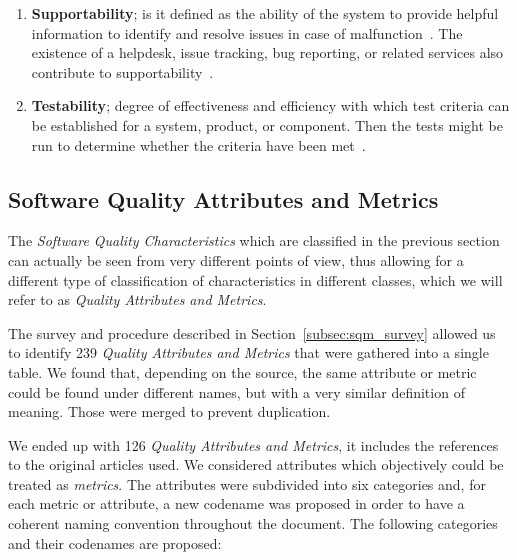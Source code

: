 \begin{enumerate}
    \item \textbf{Supportability}; is it defined as the ability of the system to provide helpful information  to identify and resolve issues in case of malfunction~\cite{microsoft_2010}. The existence of a helpdesk, issue tracking, bug reporting, or related services also contribute to supportability~\cite{orviz_fernandez_eosc-synergy_2020}.

    \item \textbf{Testability}; degree of effectiveness and efficiency with which test criteria can be established for a system, product, or component. Then the tests might be run to determine whether the criteria have been met~\cite{iso_25010_2011_2017}.
\end{enumerate}

\subsection{Software Quality Attributes and Metrics}
\label{subsec:SW_quality_attributes}

The \textit{Software Quality Characteristics} which are classified in the previous section can actually be seen from very different points of view, thus allowing for a different type of classification of characteristics in different classes, which we will refer to as \textit{Quality Attributes and Metrics}.

The survey and procedure described in Section~\ref{subsec:sqm_survey} allowed us to identify 239 \textit{Quality Attributes and Metrics} that were gathered into a single table. We found that, depending on the source, the same attribute or metric could be found under different names, but with a very similar definition of meaning. Those were merged to prevent duplication.

We ended up with 126 \textit{Quality Attributes and Metrics}, it includes the references to the original articles used. We considered attributes which objectively could be treated as \textit{metrics}. The attributes were subdivided into six categories and, for each metric or attribute, a new codename was proposed in order to have a coherent naming convention throughout the document. The following categories and their codenames are proposed:

